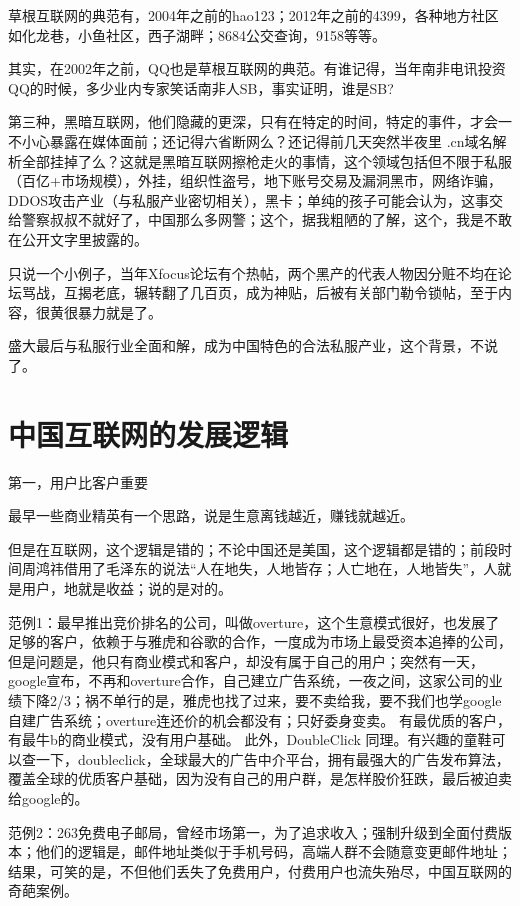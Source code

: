 草根互联网的典范有，2004年之前的hao123；2012年之前的4399，各种地方社区如化龙巷，小鱼社区，西子湖畔；8684公交查询，9158等等。

其实，在2002年之前，QQ也是草根互联网的典范。有谁记得，当年南非电讯投资QQ的时候，多少业内专家笑话南非人SB，事实证明，谁是SB?


第三种，黑暗互联网，他们隐藏的更深，只有在特定的时间，特定的事件，才会一不小心暴露在媒体面前；还记得六省断网么？还记得前几天突然半夜里 .cn域名解析全部挂掉了么？这就是黑暗互联网擦枪走火的事情，这个领域包括但不限于私服（百亿+市场规模），外挂，组织性盗号，地下账号交易及漏洞黑市，网络诈骗，DDOS攻击产业（与私服产业密切相关），黑卡；单纯的孩子可能会认为，这事交给警察叔叔不就好了，中国那么多网警；这个，据我粗陋的了解，这个，我是不敢在公开文字里披露的。

只说一个小例子，当年Xfocus论坛有个热帖，两个黑产的代表人物因分赃不均在论坛骂战，互揭老底，辗转翻了几百页，成为神贴，后被有关部门勒令锁帖，至于内容，很黄很暴力就是了。

盛大最后与私服行业全面和解，成为中国特色的合法私服产业，这个背景，不说了。


\section{中国互联网的发展逻辑}

第一，用户比客户重要

    最早一些商业精英有一个思路，说是生意离钱越近，赚钱就越近。

    但是在互联网，这个逻辑是错的；不论中国还是美国，这个逻辑都是错的；前段时间周鸿祎借用了毛泽东的说法“人在地失，人地皆存；人亡地在，人地皆失”，人就是用户，地就是收益；说的是对的。

    范例1：最早推出竞价排名的公司，叫做overture，这个生意模式很好，也发展了足够的客户，依赖于与雅虎和谷歌的合作，一度成为市场上最受资本追捧的公司，但是问题是，他只有商业模式和客户，却没有属于自己的用户；突然有一天，google宣布，不再和overture合作，自己建立广告系统，一夜之间，这家公司的业绩下降2/3；祸不单行的是，雅虎也找了过来，要不卖给我，要不我们也学google自建广告系统；overture连还价的机会都没有；只好委身变卖。 有最优质的客户，有最牛b的商业模式，没有用户基础。  此外，DoubleClick 同理。有兴趣的童鞋可以查一下，doubleclick，全球最大的广告中介平台，拥有最强大的广告发布算法，覆盖全球的优质客户基础，因为没有自己的用户群，是怎样股价狂跌，最后被迫卖给google的。

    范例2：263免费电子邮局，曾经市场第一，为了追求收入；强制升级到全面付费版本；他们的逻辑是，邮件地址类似于手机号码，高端人群不会随意变更邮件地址；结果，可笑的是，不但他们丢失了免费用户，付费用户也流失殆尽，中国互联网的奇葩案例。

